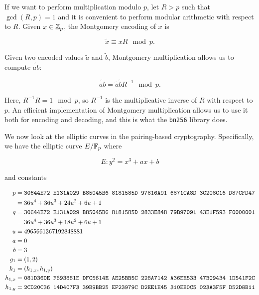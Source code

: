 If we want to perform multiplication modulo $p$, let $R>p$ such
that $\gcd(R,p) = 1$ and it is convenient to perform modular arithmetic
with respect to $R$.
Given $x\in\mathbb{Z}_{p}$, the Montgomery encoding of $x$ is

\begin{equation}
    \tilde{x} \equiv xR \mod p.
\end{equation}

\noindent
Given two encoded values $\tilde{a}$ and $\tilde{b}$,
Montgomery multiplication allows us to compute $\widetilde{ab}$:

\begin{equation}
    \widetilde{ab} = \tilde{a}\tilde{b}R^{-1} \mod p.
\end{equation}

\noindent
Here, $R^{-1}R = 1 \mod p$, so $R^{-1}$ is the multiplicative
inverse of $R$ with respect to $p$.
An efficient implementation of Montgomery multiplication
allows us to use it both for encoding and decoding,
and this is what the \texttt{bn256} library does.

We now look at the elliptic curves in the pairing-based cryptography.
Specifically, we have the elliptic curve $E/\mathbb{F}_{p}$ where

\begin{equation}
    E : y^{2} = x^{3} + ax + b
\end{equation}

\noindent
and constants

\begin{align}
    p &= \texttt{30644E72 E131A029 B85045B6 8181585D 97816A91 6871CA8D 3C208C16
                D87CFD47} \nonumber\\
        &= 36u^{4} + 36u^{3} + 24u^{2} + 6u + 1 \nonumber\\
    q &= \texttt{30644E72 E131A029 B85045B6 8181585D 2833E848 79B97091 43E1F593
                F0000001} \nonumber\\
        &= 36u^{4} + 36u^{3} + 18u^{2} + 6u + 1 \nonumber\\
    u &= 4965661367192848881 \nonumber\\
    a &= 0 \nonumber\\
    b &= 3 \nonumber\\
    g_{1} &= \left( 1,2 \right) \nonumber\\
    h_{1} &= \left( h_{1,x}, h_{1,y} \right) \nonumber\\
    h_{1,x} &= \texttt{081D36DE F693881E DFC5614E AE25BB5C 228A7142 A36EE533 47B09434 1D541F2C} \nonumber\\
    h_{1,y} &= \texttt{2CD20C36 14D407F3 39B9BB25 EF23979C D2EE1E45 310EB0C5 023A3F5F D52D8B11}
\end{align}

